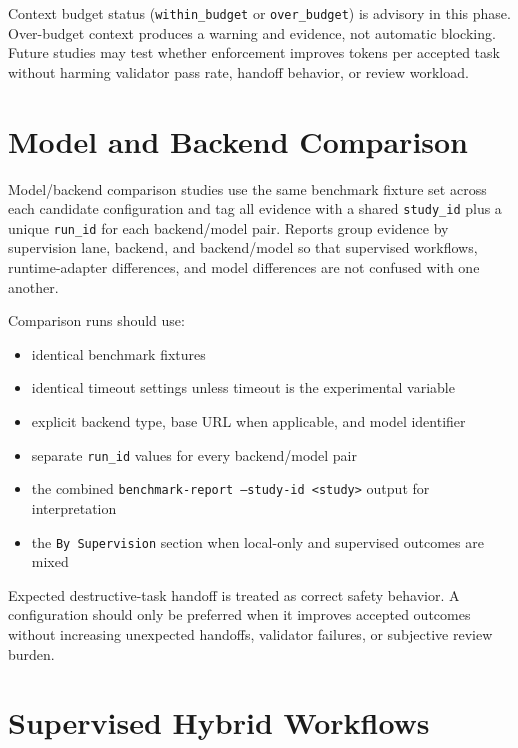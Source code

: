 \documentclass[12pt]{article}
\begin{document}
Context budget status (\texttt{within\_budget} or \texttt{over\_budget}) is
advisory in this phase. Over-budget context produces a warning and evidence,
not automatic blocking. Future studies may test whether enforcement improves
tokens per accepted task without harming validator pass rate, handoff behavior,
or review workload.

\section{Model and Backend Comparison}

Model/backend comparison studies use the same benchmark fixture set across
each candidate configuration and tag all evidence with a shared
\texttt{study\_id} plus a unique \texttt{run\_id} for each backend/model pair.
Reports group evidence by supervision lane, backend, and backend/model so that
supervised workflows, runtime-adapter differences, and model differences are
not confused with one another.

Comparison runs should use:
\begin{itemize}
  \item identical benchmark fixtures
  \item identical timeout settings unless timeout is the experimental variable
  \item explicit backend type, base URL when applicable, and model identifier
  \item separate \texttt{run\_id} values for every backend/model pair
  \item the combined \texttt{benchmark-report --study-id <study>} output for
    interpretation
  \item the \texttt{By Supervision} section when local-only and supervised
    outcomes are mixed
\end{itemize}

Expected destructive-task handoff is treated as correct safety behavior. A
configuration should only be preferred when it improves accepted outcomes
without increasing unexpected handoffs, validator failures, or subjective review
burden.

\section{Supervised Hybrid Workflows}
\end{document}

